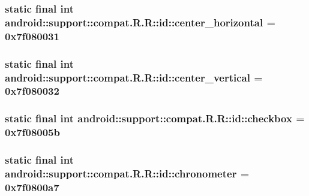 \hypertarget{classandroid_1_1support_1_1compat_1_1_r_1_1id_e6ab5b76e959bc12b16dd217f291b2a0}{
\subsubsection[{center\_\-horizontal}]{\setlength{\rightskip}{0pt plus 5cm}static final int android::support::compat.R.R::id::center\_\-horizontal = 0x7f080031}}
\label{classandroid_1_1support_1_1compat_1_1_r_1_1id_e6ab5b76e959bc12b16dd217f291b2a0}


\hypertarget{classandroid_1_1support_1_1compat_1_1_r_1_1id_bf35779ce5f1aaa6a961c6b853253141}{
\subsubsection[{center\_\-vertical}]{\setlength{\rightskip}{0pt plus 5cm}static final int android::support::compat.R.R::id::center\_\-vertical = 0x7f080032}}
\label{classandroid_1_1support_1_1compat_1_1_r_1_1id_bf35779ce5f1aaa6a961c6b853253141}


\hypertarget{classandroid_1_1support_1_1compat_1_1_r_1_1id_09e3f9d19cf1d9b6985af2e0a667dcdc}{
\subsubsection[{checkbox}]{\setlength{\rightskip}{0pt plus 5cm}static final int android::support::compat.R.R::id::checkbox = 0x7f08005b}}
\label{classandroid_1_1support_1_1compat_1_1_r_1_1id_09e3f9d19cf1d9b6985af2e0a667dcdc}


\hypertarget{classandroid_1_1support_1_1compat_1_1_r_1_1id_dc5beb6f73b6fc6554f1a781d98b99a2}{
\subsubsection[{chronometer}]{\setlength{\rightskip}{0pt plus 5cm}static final int android::support::compat.R.R::id::chronometer = 0x7f0800a7}}
\label{classandroid_1_1support_1_1compat_1_1_r_1_1id_dc5beb6f73b6fc6554f1a781d98b99a2}


